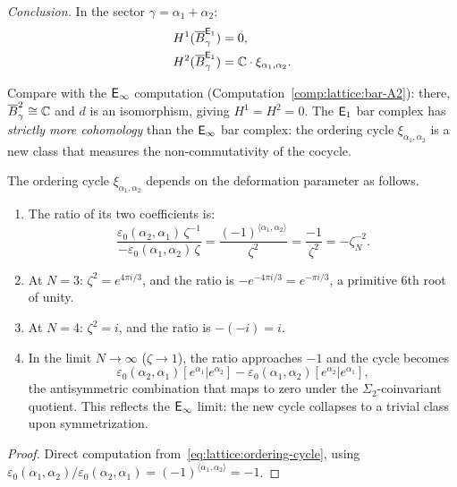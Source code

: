 \begin{computation}
\emph{Conclusion.}  In the sector $\gamma = \alpha_1 + \alpha_2$:
\begin{align*}
H^1(\overline{B}^{\mathsf{E}_1}_\gamma) &= 0, \\
H^2(\overline{B}^{\mathsf{E}_1}_\gamma) &= \mathbb{C} \cdot \xi_{\alpha_1,\alpha_2}.
\end{align*}

Compare with the $\mathsf{E}_{\infty}$ computation
(Computation~\ref{comp:lattice:bar-A2}):
there, $\overline{B}^2_\gamma \cong \mathbb{C}$ and $d$ is an isomorphism, giving
$H^1 = H^2 = 0$.  The $\mathsf{E}_1$ bar complex has \emph{strictly more
cohomology} than the $\mathsf{E}_{\infty}$ bar complex: the ordering cycle
$\xi_{\alpha_1,\alpha_2}$ is a new class that measures the
non-commutativity of the cocycle.
\end{computation}

\begin{proposition}
\label{prop:lattice:ordering-cycle-phase}
The ordering cycle $\xi_{\alpha_1,\alpha_2}$ depends on the
deformation parameter as follows.
\begin{enumerate}[label=(\roman*)]
\item The ratio of its two coefficients is:
\begin{equation}\label{eq:lattice:cycle-ratio}
\frac{\varepsilon_0(\alpha_2,\alpha_1)\,\zeta^{-1}}%
     {-\varepsilon_0(\alpha_1,\alpha_2)\,\zeta}
= \frac{(-1)^{\langle\alpha_1,\alpha_2\rangle}}{\zeta^2}
= \frac{-1}{\zeta^2}
= -\zeta_N^{-2}.
\end{equation}
\item At $N = 3$: $\zeta^2 = e^{4\pi i/3}$, and the ratio is
  $-e^{-4\pi i/3} = e^{-\pi i/3}$, a primitive 6th root of unity.
\item At $N = 4$: $\zeta^2 = i$, and the ratio is $-(-i) = i$.
\item In the limit $N \to \infty$ \textup{(}$\zeta \to 1$\textup{)},
  the ratio approaches $-1$ and the cycle becomes
  \[
  \varepsilon_0(\alpha_2,\alpha_1)[e^{\alpha_1}|e^{\alpha_2}]
  - \varepsilon_0(\alpha_1,\alpha_2)[e^{\alpha_2}|e^{\alpha_1}],
  \]
  the antisymmetric combination that maps to
  zero under the $\Sigma_2$-coinvariant quotient.
  This reflects the $\mathsf{E}_{\infty}$ limit: the new cycle collapses to a
  trivial class upon symmetrization.
\end{enumerate}
\end{proposition}

\begin{proof}
Direct computation from~\eqref{eq:lattice:ordering-cycle}, using
$\varepsilon_0(\alpha_1,\alpha_2)/\varepsilon_0(\alpha_2,\alpha_1)
= (-1)^{\langle\alpha_1,\alpha_2\rangle} = -1$.
\end{proof}


